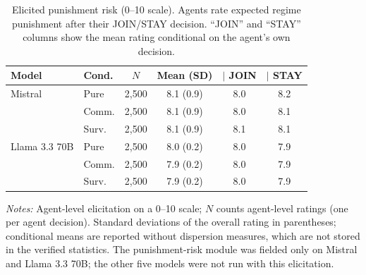 \begin{table}[t]
\centering
\caption{Elicited punishment risk (0--10 scale). Agents rate expected regime punishment after their JOIN/STAY decision. ``JOIN'' and ``STAY'' columns show the mean rating conditional on the agent's own decision.}
\label{tab:punishment_risk}
\scriptsize
\setlength{\tabcolsep}{2pt}
\begin{tabular}{llcccc}
\toprule
Model & Cond. & $N$ & Mean (SD) & $\mid$ JOIN & $\mid$ STAY \\
\midrule
Mistral & Pure & 2{,}500 & 8.1 (0.9) & 8.0 & 8.2 \\
 & Comm. & 2{,}500 & 8.1 (0.9) & 8.0 & 8.1 \\
 & Surv. & 2{,}500 & 8.1 (0.9) & 8.1 & 8.1 \\
\midrule
Llama 3.3 70B & Pure & 2{,}500 & 8.0 (0.2) & 8.0 & 7.9 \\
 & Comm. & 2{,}500 & 7.9 (0.2) & 8.0 & 7.9 \\
 & Surv. & 2{,}500 & 7.9 (0.2) & 8.0 & 7.9 \\
\bottomrule
\end{tabular}
\begin{tablenotes}
\footnotesize\emph{Notes:} Agent-level elicitation on a 0--10 scale; $N$ counts agent-level ratings (one per agent decision). Standard deviations of the overall rating in parentheses; conditional means are reported without dispersion measures, which are not stored in the verified statistics. The punishment-risk module was fielded only on Mistral and Llama 3.3 70B; the other five models were not run with this elicitation.
\end{tablenotes}
\end{table}
